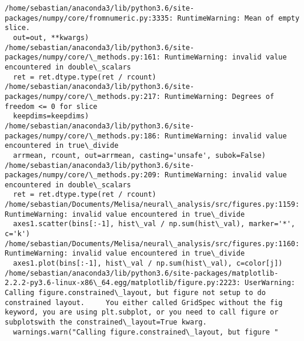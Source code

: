 \documentclass[11pt]{article}
\begin{document}
    \begin{Verbatim}[commandchars=\\\{\}]
/home/sebastian/anaconda3/lib/python3.6/site-packages/numpy/core/fromnumeric.py:3335: RuntimeWarning: Mean of empty slice.
  out=out, **kwargs)
/home/sebastian/anaconda3/lib/python3.6/site-packages/numpy/core/\_methods.py:161: RuntimeWarning: invalid value encountered in double\_scalars
  ret = ret.dtype.type(ret / rcount)
/home/sebastian/anaconda3/lib/python3.6/site-packages/numpy/core/\_methods.py:217: RuntimeWarning: Degrees of freedom <= 0 for slice
  keepdims=keepdims)
/home/sebastian/anaconda3/lib/python3.6/site-packages/numpy/core/\_methods.py:186: RuntimeWarning: invalid value encountered in true\_divide
  arrmean, rcount, out=arrmean, casting='unsafe', subok=False)
/home/sebastian/anaconda3/lib/python3.6/site-packages/numpy/core/\_methods.py:209: RuntimeWarning: invalid value encountered in double\_scalars
  ret = ret.dtype.type(ret / rcount)
/home/sebastian/Documents/Melisa/neural\_analysis/src/figures.py:1159: RuntimeWarning: invalid value encountered in true\_divide
  axes1.scatter(bins[:-1], hist\_val / np.sum(hist\_val), marker='*', c='k')
/home/sebastian/Documents/Melisa/neural\_analysis/src/figures.py:1160: RuntimeWarning: invalid value encountered in true\_divide
  axes1.plot(bins[:-1], hist\_val / np.sum(hist\_val), c=color[j])
/home/sebastian/anaconda3/lib/python3.6/site-packages/matplotlib-2.2.2-py3.6-linux-x86\_64.egg/matplotlib/figure.py:2223: UserWarning: Calling figure.constrained\_layout, but figure not setup to do constrained layout.     You either called GridSpec without the fig keyword, you are using plt.subplot, or you need to call figure or subplotswith the constrained\_layout=True kwarg.
  warnings.warn("Calling figure.constrained\_layout, but figure "

    \end{Verbatim}

    \begin{center}
    \end{center}
    { \hspace*{\fill} \\}
    
    \begin{center}
    \end{center}
    { \hspace*{\fill} \\}
    
    \begin{center}
    \end{center}
    { \hspace*{\fill} \\}
    

    
    
    
    
\end{document}
